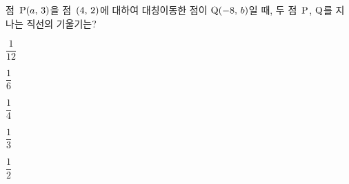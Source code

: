 점~$\mathrm{P}(a,\mkern3mu 3)$을 점~$(4,\mkern3mu 2)$에 대하여 대칭이동한 점이 $\mathrm{Q}(-8,\mkern3mu b)$일 때, 두 점~$\mathrm{P}$, $\mathrm{Q}$를 지나는 직선의 기울기는?
\begin{choices32}{\rule[-3ex]{0pt}{8ex}$\dfrac{1}{12}$}{\rule[-3ex]{0pt}{8ex}$\dfrac{1}{6}$}{\rule[-3ex]{0pt}{8ex}$\dfrac{1}{4}$}{\rule[-3ex]{0pt}{8ex}$\dfrac{1}{3}$}{\rule[-3ex]{0pt}{8ex}$\dfrac{1}{2}$}\end{choices32}
